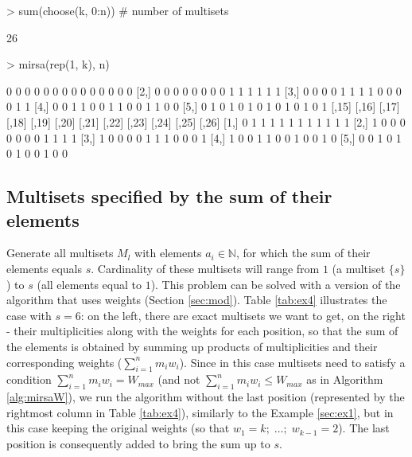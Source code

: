 \documentclass[11pt]{article}
\begin{document}
\begin{Schunk}
\begin{Sinput}
> sum(choose(k, 0:n))  # number of multisets
\end{Sinput}
\begin{Soutput}
[1] 26
\end{Soutput}
\begin{Sinput}
> mirsa(rep(1, k), n)
\end{Sinput}
\begin{Soutput}
     [,1] [,2] [,3] [,4] [,5] [,6] [,7] [,8] [,9] [,10] [,11] [,12] [,13] [,14]
[1,]    0    0    0    0    0    0    0    0    0     0     0     0     0     0
[2,]    0    0    0    0    0    0    0    0    1     1     1     1     1     1
[3,]    0    0    0    0    1    1    1    1    0     0     0     0     1     1
[4,]    0    0    1    1    0    0    1    1    0     0     1     1     0     0
[5,]    0    1    0    1    0    1    0    1    0     1     0     1     0     1
     [,15] [,16] [,17] [,18] [,19] [,20] [,21] [,22] [,23] [,24] [,25] [,26]
[1,]     0     1     1     1     1     1     1     1     1     1     1     1
[2,]     1     0     0     0     0     0     0     0     1     1     1     1
[3,]     1     0     0     0     0     1     1     1     0     0     0     1
[4,]     1     0     0     1     1     0     0     1     0     0     1     0
[5,]     0     0     1     0     1     0     1     0     0     1     0     0
\end{Soutput}
\end{Schunk}

\subsection{Multisets specified by the sum of their elements} \label{sec:ex4}

Generate all multisets $M_l$ with elements $a_i \in \mathbb{N}$, for which the sum of their elements equals $s$. Cardinality of these multisets will range from $1$ (a multiset $\{s\}$) to $s$ (all elements equal to $1$). This problem can be solved with a version of the algorithm that uses weights (Section \ref{sec:mod}). Table \ref{tab:ex4} illustrates the case with $s = 6$: on the left, there are exact multisets we want to get, on the right - their multiplicities along with the weights for each position, so that the sum of the elements is obtained by summing up products of multiplicities and their corresponding weights ($\sum_{i = 1}^n m_i w_i$). Since in this case multisets need to satisfy a condition $\sum_{i = 1}^n m_i w_i = W_{max}$ (and not $\sum_{i = 1}^n m_i w_i \leqslant W_{max}$ as in Algorithm \ref{alg:mirsaW}), we run the algorithm without the last position (represented by the rightmost column in Table \ref{tab:ex4}), similarly to the Example \ref{sec:ex1}, but in this case keeping the original weights (so that $w_1 = k; \; \dotsc; \; w_{k - 1} = 2$). The last position is consequently added to bring the sum up to $s$. \\
\end{document}
